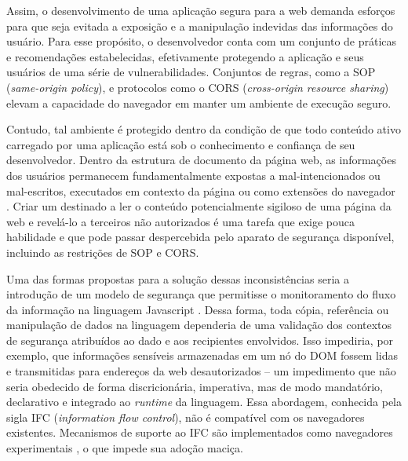 Assim, o desenvolvimento de uma aplicação segura para a web demanda esforços para que seja evitada a exposição e a manipulação indevidas das informações do usuário. Para esse propósito, o desenvolvedor conta com um conjunto de práticas e recomendações estabelecidas, efetivamente protegendo a aplicação e seus usuários de uma série de vulnerabilidades. Conjuntos de regras, como a SOP (\textit{same-origin policy}), e protocolos como o CORS (\textit{cross-origin resource sharing}) elevam a capacidade do navegador em manter um ambiente de execução seguro.%

Contudo, tal ambiente é protegido dentro da condição de que todo conteúdo ativo carregado por uma aplicação está sob o conhecimento e confiança de seu desenvolvedor. Dentro da estrutura de documento da página web, as informações dos usuários permanecem fundamentalmente expostas a {\scripts} mal-intencionados ou mal-escritos, executados em contexto da página ou como extensões do navegador \cite{Heule2015_Most_Dangerous_Code}. Criar um {\script} destinado a ler o conteúdo potencialmente sigiloso de uma página da web e revelá-lo a terceiros não autorizados é uma tarefa que exige pouca habilidade e que pode passar despercebida pelo aparato de segurança disponível, incluindo as restrições de SOP e CORS.

Uma das formas propostas para a solução dessas inconsistências seria a introdução de um modelo de segurança que permitisse o monitoramento do fluxo da informação na linguagem Javascript \cite[p.3]{Heule2015_IFC_Inside}. Dessa forma, toda cópia, referência ou manipulação de dados na linguagem dependeria de uma validação dos contextos de segurança atribuídos ao dado e aos recipientes envolvidos. Isso impediria, por exemplo, que informações sensíveis armazenadas em um nó do DOM fossem lidas e transmitidas para endereços da web desautorizados -- um impedimento que não seria obedecido de forma discricionária, imperativa, mas de modo mandatório, declarativo e integrado ao \textit{runtime} da linguagem. Essa abordagem, conhecida pela sigla IFC (\textit{information flow control}), não é compatível com os navegadores existentes. Mecanismos de suporte ao IFC são implementados como navegadores experimentais \cite{Hedin2014, Bichhawat2014}, o que impede sua adoção maciça.

